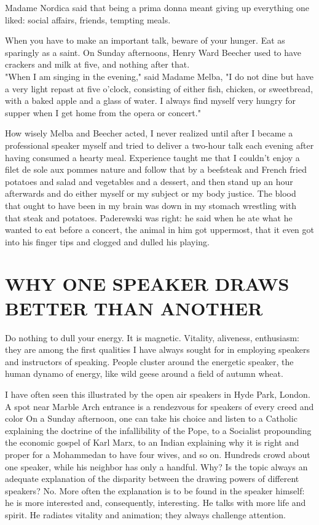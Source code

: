 \documentclass[10pt]{article}
\begin{document}
Madame Nordica said that being a prima donna meant giving up everything one liked: social affairs, friends, tempting meals.

When you have to make an important talk, beware of your hunger. Eat as sparingly as a saint. On Sunday afternoons, Henry Ward Beecher used to have crackers and milk at five, and nothing after that.\\
"When I am singing in the evening," said Madame Melba, "I do not dine but have a very light repast at five o'clock, consisting of either fish, chicken, or sweetbread, with a baked apple and a glass of water. I always find myself very hungry for supper when I get home from the opera or concert."

How wisely Melba and Beecher acted, I never realized until after I became a professional speaker myself and tried to deliver a two-hour talk each evening after having consumed a hearty meal. Experience taught me that I couldn't enjoy a filet de sole aux pommes nature and follow that by a beefsteak and French fried potatoes and salad and vegetables and a dessert, and then stand up an hour afterwards and do either myself or my subject or my body justice. The blood that ought to have been in my brain was down in my stomach wrestling with that steak and potatoes. Paderewski was right: he said when he ate what he wanted to eat before a concert, the animal in him got uppermost, that it even got into his finger tips and clogged and dulled his playing.

\section*{WHY ONE SPEAKER DRAWS BETTER THAN ANOTHER}
Do nothing to dull your energy. It is magnetic. Vitality, aliveness, enthusiasm: they are among the first qualities I have always sought for in employing speakers and instructors of speaking. People cluster around the energetic speaker, the human dynamo of energy, like wild geese around a field of autumn wheat.

I have often seen this illustrated by the open air speakers in Hyde Park, London. A spot near Marble Arch entrance is a rendezvous for speakers of every creed and color On a Sunday afternoon, one can take his choice and listen to a Catholic explaining the doctrine of the infallibility of the Pope, to a Socialist propounding the economic gospel of Karl Marx, to an Indian explaining why it is right and proper for a Mohammedan to have four wives, and so on. Hundreds crowd about one speaker, while his neighbor has only a handful. Why? Is the topic always an adequate explanation of the disparity between the drawing powers of different speakers? No. More often the explanation is to be found in the speaker himself: he is more interested and, consequently, interesting. He talks with more life and spirit. He radiates vitality and animation; they always challenge attention.
\end{document}
